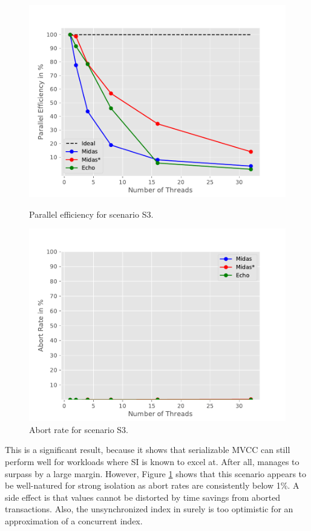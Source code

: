 \begin{figure}[h!]
\begin{minipage}[l]{0.50\textwidth}
    \includegraphics[width=\textwidth]{figures/bench/eff-ls}
    \caption{Parallel efficiency for scenario S3.}
    \label{fig:eff-s3}
\end{minipage}
\begin{minipage}[l]{0.50\textwidth}
    \includegraphics[width=\textwidth]{figures/bench/ar-ls}
    \caption{Abort rate for scenario S3.}
    \label{fig:ar-s3}
\end{minipage}
\end{figure}

This is a significant result, because it shows that serializable MVCC can still
perform well for workloads where SI is known to excel at. After all, \midasopt
manages to surpass \echo by a large margin. However, Figure \ref{fig:ar-s3}
shows that this scenario appears to be well-natured for strong isolation as
abort rates are consistently below 1\%. A side effect is that \ttp values cannot
be distorted by time savings from aborted transactions. Also, the unsynchronized
index in \midasopt surely is too optimistic for an approximation of a concurrent
index.

